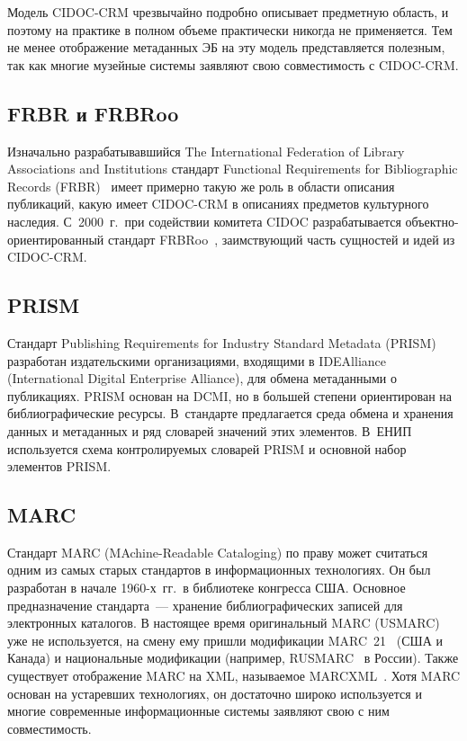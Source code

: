 \begin{multicols}{2}
  Модель CIDOC-CRM чрезвычайно подробно описывает предметную область, и поэтому 
на практике в полном объеме практически никогда не применяется. Тем не менее 
отображение метаданных ЭБ на эту модель представляется полезным, так как многие 
музейные системы заявляют свою со\-вмес\-ти\-мость с CIDOC-CRM.
  
\vspace*{-12pt}

  \subsection*{FRBR и FRBRoo}
  
  Изначально разрабатывавшийся The International Federation of Library Associations and 
Institutions стандарт Functional Requirements for Bibliographic Records (FRBR)~\cite{17ser} 
имеет примерно такую же роль в области описания публикаций, какую имеет CIDOC-CRM в 
описаниях предметов культурного наследия. С~2000~г.\ при содействии комитета CIDOC 
разрабатывается объект\-но-ори\-ен\-ти\-ро\-ван\-ный стандарт FRBRoo~\cite{18ser}, заимствующий 
часть сущностей и идей из CIDOC-CRM.
  
\vspace*{-12pt}

  \subsection*{PRISM}
  
  Стандарт Publishing Requirements for Industry Standard Metadata (PRISM)~\cite{13ser} 
разработан издательскими организациями, входящими в IDEAlliance (International Digital 
Enterprise Alliance), для обмена метаданными о публикациях. PRISM основан на DCMI, но в 
большей степени ориентирован на библиографические ресурсы. В~стандарте предлагается 
среда обмена и хранения данных и метаданных и ряд словарей значений этих элементов. 
В~ЕНИП используется схема контролируемых словарей PRISM и основной набор элементов 
PRISM.
  
\vspace*{-12pt}

  \subsection*{MARC}
  
  Стандарт MARC (MAchine-Readable Cataloging) по праву может считаться одним из 
самых старых стандартов в информационных технологиях. Он был разработан в начале 
  1960-х~гг.\ в библиотеке конгресса США. Основное предназначение стандарта~--- 
хранение библиографических записей для электронных каталогов. В настоящее время 
оригинальный MARC (USMARC) уже не используется, на смену ему пришли модификации 
MARC~21~\cite{19ser} (США и Канада) и национальные модификации (например, 
RUSMARC~\cite{20ser} в России). Также существует отображение MARC на XML, 
называемое MARCXML~\cite{21ser}. Хотя MARC основан на устаревших технологиях, он 
достаточно широко используется и многие современные информационные сис\-те\-мы заявляют 
свою с ним совместимость.


\end{multicols}
